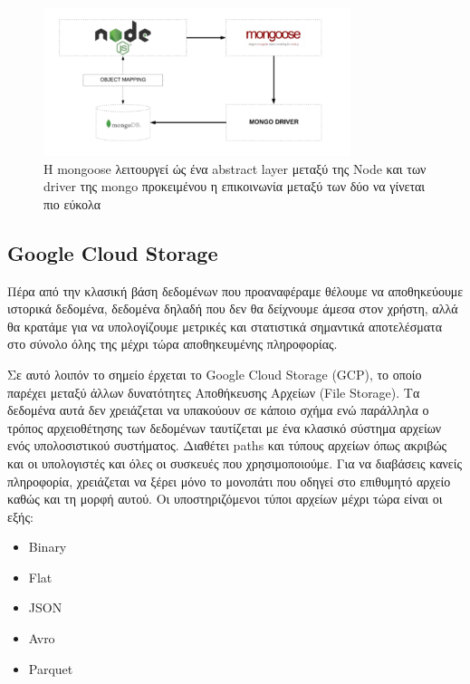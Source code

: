 \begin{figure}[!ht]
	\centering
	\includegraphics[width=0.8\textwidth]{./images/chapter2/mongoose.png}
	\caption[H mongoose λειτουργεί ώς ένα abstract layer μεταξύ της Node και των driver της mongo προκειμένου η επικοινωνία μεταξύ των δύο να γίνεται πιο εύκολα]
	{H mongoose λειτουργεί ώς ένα abstract layer μεταξύ της Node και των driver της mongo προκειμένου η επικοινωνία μεταξύ των δύο να γίνεται πιο εύκολα}
	\label{fig:mongoose}
\end{figure}

\break

\subsection{Google Cloud Storage}
\label{subsec:gcloud}

Πέρα από την κλασική βάση δεδομένων που προαναφέραμε θέλουμε να αποθηκεύουμε ιστορικά δεδομένα,
δεδομένα δηλαδή που δεν θα δείχνουμε άμεσα στον χρήστη, αλλά θα κρατάμε για να υπολογίζουμε μετρικές
και στατιστικά σημαντικά αποτελέσματα στο σύνολο όλης της μέχρι τώρα αποθηκευμένης πληροφορίας.

Σε αυτό λοιπόν το σημείο έρχεται το Google Cloud Storage (GCP), το οποίο παρέχει μεταξύ άλλων δυνατότητες
Αποθήκευσης Αρχείων (File Storage). Τα δεδομένα αυτά δεν χρειάζεται να υπακούουν σε κάποιο σχήμα
ενώ παράλληλα ο τρόπος αρχειοθέτησης των δεδομένων ταυτίζεται με ένα κλασικό σύστημα αρχείων
ενός υπολοσιστικού συστήματος. Διαθέτει paths και τύπους αρχείων όπως ακριβώς και οι υπολογιστές και όλες οι
συσκευές που χρησιμοποιούμε. Για να διαβάσεις κανείς πληροφορία, χρειάζεται να ξέρει μόνο το μονοπάτι που οδηγεί
στο επιθυμητό αρχείο καθώς και τη μορφή αυτού. Οι υποστηριζόμενοι τύποι αρχείων μέχρι τώρα είναι οι εξής:

\begin{itemize}
	\item Binary
	\item Flat
	\item JSON
	\item Avro
	\item Parquet
\end{itemize}

